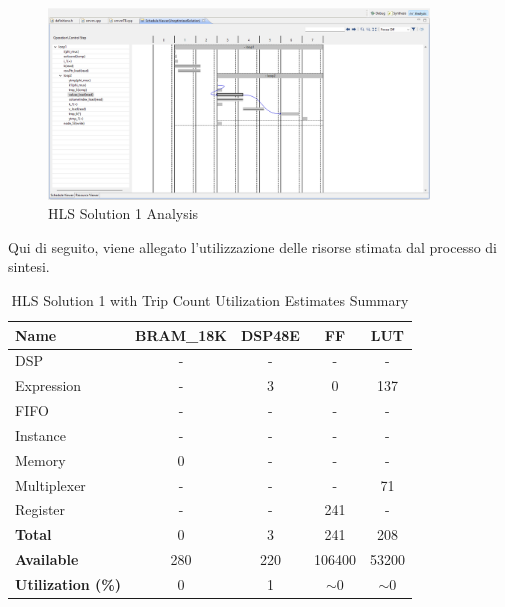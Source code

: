 \begin{figure}[H]
	\centering
	\includegraphics[width=0.9\textwidth]{solutions/s1/s1analysis.png}
	\caption{HLS Solution 1 Analysis}
\end{figure}

Qui di seguito, viene allegato l'utilizzazione delle risorse stimata dal processo di sintesi.
\begin{table}[H]
	\centering
	\begin{tabular}{|l|c|c|c|c|}
		\hline
		\textbf{Name}    & \textbf{BRAM\_18K} & \textbf{DSP48E} & \textbf{FF} & \textbf{LUT} \\ \hline
		DSP              & -                   & -               & -           & -            \\ 
		Expression       & -                   & 3               & 0           & 137          \\ 
		FIFO             & -                   & -               & -           & -            \\ 
		Instance         & -                   & -               & -           & -            \\ 
		Memory           & 0                   & -               & -          & -            \\ 
		Multiplexer      & -                   & -               & -           & 71          \\ 
		Register         & -                   & -               & 241         & -            \\ \hline
		\textbf{Total}   & 0                   & 3               & 241         & 208          \\ \hline
		\textbf{Available} & 280               & 220             & 106400      & 53200        \\ \hline
		\textbf{Utilization (\%)} & 0            & 1               & $\sim$0     & $\sim$0      \\ \hline
	\end{tabular}
	\caption{HLS Solution 1 with Trip Count Utilization Estimates Summary}
	\label{tab:hls-solution-1-utilization-estimates-summary}
\end{table}

